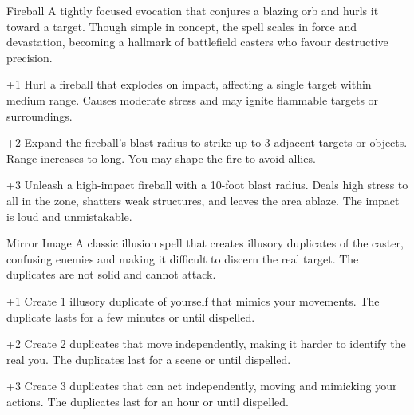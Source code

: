 \begin{WyrdSpell}[Elemental]{Fireball}
    A tightly focused evocation that conjures a blazing orb and hurls it toward a target. Though simple in concept, the spell scales in force and devastation, becoming a hallmark of battlefield casters who favour destructive precision.

    \begin{WyrdSpellBlock}
        \item[+1] Hurl a fireball that explodes on impact, affecting a single target within medium range. Causes moderate stress and may ignite flammable targets or surroundings.
        \item[+2] Expand the fireball’s blast radius to strike up to 3 adjacent targets or objects. Range increases to long. You may shape the fire to avoid allies.
        \item[+3] Unleash a high-impact fireball with a 10-foot blast radius. Deals high stress to all in the zone, shatters weak structures, and leaves the area ablaze. The impact is loud and unmistakable.
    \end{WyrdSpellBlock}
\end{WyrdSpell}

\begin{WyrdSpell}[Illusion]{Mirror Image}
    A classic illusion spell that creates illusory duplicates of the caster, confusing enemies and making it difficult to discern the real target. The duplicates are not solid and cannot attack.

    \begin{WyrdSpellBlock}
        \item[+1] Create 1 illusory duplicate of yourself that mimics your movements. The duplicate lasts for a few minutes or until dispelled.
        \item[+2] Create 2 duplicates that move independently, making it harder to identify the real you. The duplicates last for a scene or until dispelled.
        \item[+3] Create 3 duplicates that can act independently, moving and mimicking your actions. The duplicates last for an hour or until dispelled.
    \end{WyrdSpellBlock}
\end{WyrdSpell}


